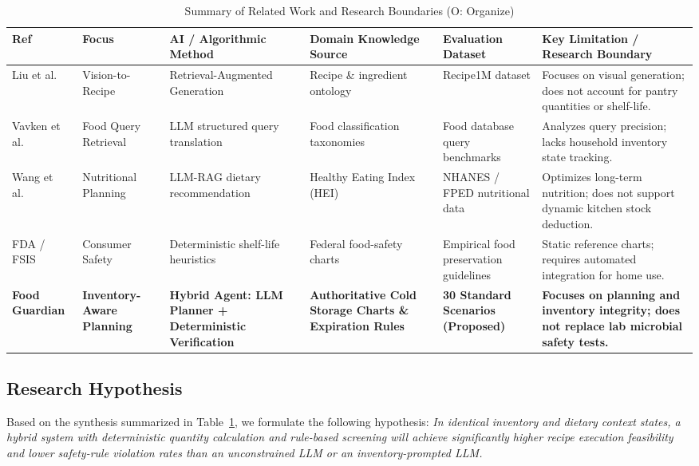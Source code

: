 \begin{table}[t]
\caption{Summary of Related Work and Research Boundaries (O: Organize)}
\label{tab:related_work}
\centering
\footnotesize
\setlength{\tabcolsep}{4pt}
\begin{tabularx}{\textwidth}{@{}>{\raggedright\arraybackslash}p{1.8cm}*{5}{>{\raggedright\arraybackslash}X}@{}}
\toprule
\textbf{Ref} & \textbf{Focus} & \textbf{AI / Algorithmic Method} & \textbf{Domain Knowledge Source} & \textbf{Evaluation Dataset} & \textbf{Key Limitation / Research Boundary} \\
\midrule
Liu et al.~\cite{R4_Liu2025_WACV} & Vision-to-Recipe & Retrieval-Augmented Generation & Recipe \& ingredient ontology & Recipe1M dataset & Focuses on visual generation; does not account for pantry quantities or shelf-life. \\
Vavken et al.~\cite{R5_Vavken2026} & Food Query Retrieval & LLM structured query translation & Food classification taxonomies & Food database query benchmarks & Analyzes query precision; lacks household inventory state tracking. \\
Wang et al.~\cite{R6_Wang2026} & Nutritional Planning & LLM-RAG dietary recommendation & Healthy Eating Index (HEI) & NHANES / FPED nutritional data & Optimizes long-term nutrition; does not support dynamic kitchen stock deduction. \\
FDA / FSIS~\cite{R2_FDA2026, R3_FoodSafety2023} & Consumer Safety & Deterministic shelf-life heuristics & Federal food-safety charts & Empirical food preservation guidelines & Static reference charts; requires automated integration for home use. \\
\textbf{Food Guardian} & \textbf{Inventory-Aware Planning} & \textbf{Hybrid Agent: LLM Planner + Deterministic Verification} & \textbf{Authoritative Cold Storage Charts \& Expiration Rules} & \textbf{30 Standard Scenarios (Proposed)} & \textbf{Focuses on planning and inventory integrity; does not replace lab microbial safety tests.} \\
\bottomrule
\end{tabularx}
\end{table}

\subsection{Research Hypothesis}
Based on the synthesis summarized in Table~\ref{tab:related_work}, we formulate the following hypothesis: \textit{In identical inventory and dietary context states, a hybrid system with deterministic quantity calculation and rule-based screening will achieve significantly higher recipe execution feasibility and lower safety-rule violation rates than an unconstrained LLM or an inventory-prompted LLM.}
